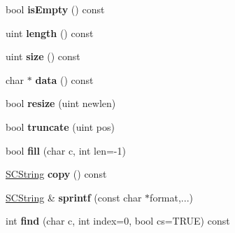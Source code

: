 \begin{DoxyCompactItemize}
\item 
\hypertarget{class_s_c_string_a479432127ee77145cc19d6a2d1590821}{bool {\bfseries is\-Empty} () const }\label{class_s_c_string_a479432127ee77145cc19d6a2d1590821}

\item 
\hypertarget{class_s_c_string_ab0edbf251efc0562d70132e931e3cf06}{uint {\bfseries length} () const }\label{class_s_c_string_ab0edbf251efc0562d70132e931e3cf06}

\item 
\hypertarget{class_s_c_string_a7e63723212bed1ca52f0fe57e58b812e}{uint {\bfseries size} () const }\label{class_s_c_string_a7e63723212bed1ca52f0fe57e58b812e}

\item 
\hypertarget{class_s_c_string_ad9319003da5b44fcac43001237ecb9cd}{char $\ast$ {\bfseries data} () const }\label{class_s_c_string_ad9319003da5b44fcac43001237ecb9cd}

\item 
\hypertarget{class_s_c_string_a378c0f518d23c55f949bd0dd39c87849}{bool {\bfseries resize} (uint newlen)}\label{class_s_c_string_a378c0f518d23c55f949bd0dd39c87849}

\item 
\hypertarget{class_s_c_string_a1546e903bdbf7b496b4f8b05a5ff908d}{bool {\bfseries truncate} (uint pos)}\label{class_s_c_string_a1546e903bdbf7b496b4f8b05a5ff908d}

\item 
\hypertarget{class_s_c_string_a31c02c2c1d3805a87e49dd877b0ca0bd}{bool {\bfseries fill} (char c, int len=-\/1)}\label{class_s_c_string_a31c02c2c1d3805a87e49dd877b0ca0bd}

\item 
\hypertarget{class_s_c_string_a0a311bdfc4a64b4efa7ab813f874695b}{\hyperlink{class_s_c_string}{S\-C\-String} {\bfseries copy} () const }\label{class_s_c_string_a0a311bdfc4a64b4efa7ab813f874695b}

\item 
\hypertarget{class_s_c_string_a8acde73a82788396d5498b25f87e5b34}{\hyperlink{class_s_c_string}{S\-C\-String} \& {\bfseries sprintf} (const char $\ast$format,...)}\label{class_s_c_string_a8acde73a82788396d5498b25f87e5b34}

\item 
\hypertarget{class_s_c_string_ad64e3aef2a281ce7550aee1970a86a7e}{int {\bfseries find} (char c, int index=0, bool cs=T\-R\-U\-E) const }\label{class_s_c_string_ad64e3aef2a281ce7550aee1970a86a7e}


\end{DoxyCompactItemize}
